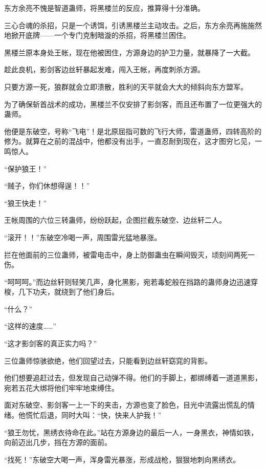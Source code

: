 
\begin{this_body}



东方余亮不愧是智道蛊师，将黑楼兰的反应，推算得十分准确。

三心合魂的杀招，只是一个诱饵，引诱黑楼兰主动攻击。之后，东方余亮再施施然地掀开底牌——一个专门克制暗漩的杀招，将黑楼兰困住。

黑楼兰原本身处王帐，现在他被困住，方源身边的护卫力量，就暴降了一大截。

趁此良机，影剑客边丝轩暴起发难，闯入王帐，再度刺杀方源。

只要方源一死，狼群就会立即溃散，胜利的天平就会大大的倾斜向东方盟军。

为了确保斩首战术的成功，黑楼兰不仅安排了影剑客，而且还布置了一位更强大的蛊师。

他便是东破空，号称“飞电”！是北原屈指可数的飞行大师，雷道蛊师，四转高阶的修为。就算在之前的混战中，他都没有出手，一直忍耐到现在，这才图穷匕见，一鸣惊人。

“保护狼王！”

“贼子，你们休想得逞！！”

“狼王快走！”

王帐周围的六位三转蛊师，纷纷跃起，企图拦截东破空、边丝轩二人。

“滚开！！”东破空冷喝一声，周围雷光猛地暴涨。

拦在他面前的三位蛊师，被雷电击中，身上防御蛊虫在瞬间毁灭，顷刻间两死一伤。

“呵呵呵。”而边丝轩则轻笑几声，身化黑影，宛若毒蛇般在挡路的蛊师身边迅速穿梭，几下功夫，就绕到了他们身后。

“什么？”

“这样的速度……”

“这才影剑客的真正实力吗？”

三位蛊师惊骇欲绝，他们回望过去，只能看到边丝轩窈窕的背影。

他们想要追赶过去，但发现自己动弹不得。他们的手脚上，都绑缚着一道道黑影，宛若五花大绑将他们牢牢地束缚住。

面对东破空、影剑客一上一下的夹击，方源也变了脸色，目光中流露出慌乱的情绪。他慌忙后退，同时大叫：“快，快来人护我！”

“狼王勿忧，黑绣衣待命在此。”站在方源身边的最后一人，一身黑衣，神情如铁，向前迈出几步，挡在方源的面前。

“找死！”东破空大喝一声，浑身雷光暴涨，形成战枪，狠狠地刺向黑绣衣。


\end{this_body}

